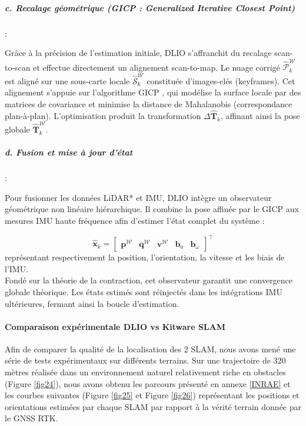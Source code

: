 \subparagraph{c. Recalage géométrique (GICP : Generalized Iterative Closest Point)}:

Grâce à la précision de l'estimation initiale, DLIO s'affranchit du recalage scan-to-scan et effectue directement un alignement scan-to-map. Le nuage corrigé $\hat{\mathcal{P}}_k^{\mathcal{W}}$ est aligné sur une sous-carte locale $\hat{\mathcal{S}}_k^{\mathcal{W}}$ constituée d'images-clés (keyframes). Cet alignement s'appuie sur l'algorithme GICP \cite{gicp}, qui modélise la surface locale par des matrices de covariance et minimise la distance de Mahalanobis (correspondance plan-à-plan). L'optimisation produit la transformation $\Delta \hat{\mathbf{T}}_k$, affinant ainsi la pose globale $\hat{\mathbf{T}}_k^{\mathcal{W}}$.

\subparagraph{d. Fusion et mise à jour d'état}: 

Pour fusionner les données LiDAR* et IMU, DLIO intègre un observateur géométrique non linéaire hiérarchique. Il combine la pose affinée par le GICP aux mesures IMU haute fréquence afin d'estimer l'état complet du système :

\begin{equation}
    \hat{\mathbf{x}}_k = \begin{bmatrix} \mathbf{p}^{\mathcal{W}} & \mathbf{q}^{\mathcal{W}} & \mathbf{v}^{\mathcal{W}} & \mathbf{b}_a & \mathbf{b}_\omega \end{bmatrix}^\top
\end{equation}
représentant respectivement la position, l'orientation, la vitesse et les biais de l'IMU.\\
\indent Fondé sur la théorie de la contraction, cet observateur garantit une convergence globale théorique. Les états estimés sont réinjectés dans les intégrations IMU ultérieures, fermant ainsi la boucle d'estimation.


\paragraph{Comparaison expérimentale DLIO vs Kitware SLAM}

Afin de comparer la qualité de la localisation des 2 SLAM, nous avons mené une série de tests expérimentaux sur différents terrains. Sur une trajectoire de 320 mètres réalisée dans un environnement naturel relativement riche en obstacles (Figure \ref{fig24}), nous avons obtenu les parcours présenté en annexe \hyperref[annexe5]{[INRAE]} et les courbes suivantes (Figure \ref{fig25} et Figure \ref{fig26}) représentant les positions et orientations estimées par chaque SLAM par rapport à la vérité terrain donnée par le GNSS RTK.\\

